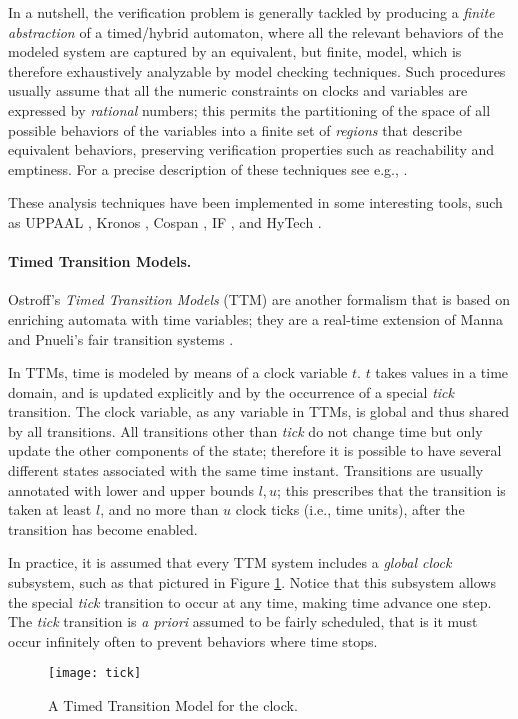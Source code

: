 In a nutshell, the verification problem is generally tackled 
by producing a \emph{finite abstraction} of a timed/hybrid automaton, 
where all the relevant behaviors of the modeled system are captured 
by an equivalent, but finite, model, which is therefore exhaustively 
analyzable by model checking techniques. Such procedures usually 
assume that all the numeric constraints on clocks and variables 
are expressed by \emph{rational} numbers; this permits the partitioning
of the space of all possible behaviors of the variables into a finite 
set of \emph{regions} that describe equivalent behaviors, preserving 
verification properties such as reachability and emptiness. 
For a precise description of these techniques see e.g., \cite{AM04,ACHHHNOSY95,HNSY94,HKPV98}.

These analysis techniques have been implemented in some interesting 
tools, such as UPPAAL \cite{LPY97}, Kronos \cite{Yov97}, Cospan \cite{AK95}, IF \cite{BGOOS04}, and HyTech \cite{HHW97}.


\paragraph{Timed Transition Models.}
Ostroff's \emph{Timed Transition Models} (TTM) \linebreak \cite{Ost90} are another 
formalism that is based on enriching automata with time variables; 
they are a real-time  extension of Manna and Pnueli's fair transition 
systems \cite{MP92}.

In TTMs, time is modeled  by means of a clock variable $t$.
$t$ takes values in a  time domain, and is updated explicitly 
and  by the occurrence of a special \emph{tick} transition. The clock 
variable, as any variable in TTMs, is global and thus shared 
by all transitions. All transitions other than \emph{tick} do not 
change time but only update the other components of the state; 
therefore it is possible to have several different states associated 
with the same time instant. Transitions are usually annotated 
with lower and upper bounds $l, u$; this prescribes that 
the transition is taken at least $l$, and no more than $u$
clock ticks (i.e., time units), after the transition has become 
enabled.

In practice, it is assumed that every TTM system includes a \emph{global clock}
subsystem, such as that pictured in Figure \ref{fig:tick}. Notice that 
this subsystem allows the special \emph{tick} transition to occur 
at any time, making time advance one step. The \emph{tick} transition 
is \emph{a priori} assumed to be fairly scheduled, that is it must 
occur infinitely often to prevent  behaviors where time stops. 
\begin{figure}[htb!]
	 \centering
	 \texttt{[image: tick]}
	 \caption{A Timed Transition Model for the clock.}
	 \label{fig:tick}
\end{figure}

